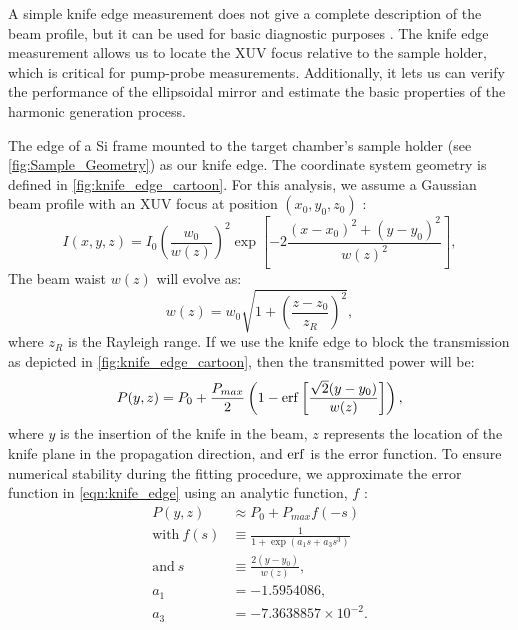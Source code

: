 A simple knife edge measurement does not give a complete description of the beam profile, but it can be used for basic diagnostic purposes \cite{siegmanHowMaybeMeasure1998,siegmanNewDevelopmentsLaser1990,siegmanDefiningMeasuringOptimizing1993}. The knife edge measurement allows us to locate the XUV focus relative to the sample holder, which is critical for pump-probe measurements. Additionally, it lets us can verify the performance of the ellipsoidal mirror and estimate the basic properties of the harmonic generation process.

The edge of a Si frame mounted to the target chamber's sample holder (see \cref{fig:Sample_Geometry}) as our knife edge. The coordinate system geometry is defined in \cref{fig:knife_edge_cartoon}. For this analysis, we assume a Gaussian beam profile with an XUV focus at position $(x_0,y_0,z_0)$ \cite{almeidaHarmonicsBeamsCharacterization2016}:
\begin{equation}
I(x,y,z) = I_0 \left( \frac{w_0}{w(z)} \right)^2 \exp \left[ -2 \frac{ (x-x_0)^2 + (y-y_0)^2 }{w(z)^2} \right],
\end{equation}
The beam waist $w(z)$ will evolve as:
\begin{equation}
w(z) = w_0 \sqrt{ 1 + \left( \frac{z-z_0}{z_R} \right)^2 },
\label{eqn:beam_waist_evolution}
\end{equation}
where $z_R$ is the Rayleigh range. If we use the knife edge to block the transmission as depicted in \cref{fig:knife_edge_cartoon}, then the transmitted power will be:
\begin{equation}
P(y, z) = P_0 + \frac{P_{max}}{2} \left( 1 - \erf \left[ \frac{\sqrt{2}(y-y_0)}{w(z)} \right] \right),
\label{eqn:knife_edge}
\end{equation}
where $y$ is the insertion of the knife in the beam, $z$ represents the location of the knife plane in the propagation direction, and $\erf$ is the error function. To ensure numerical stability during the fitting procedure, we approximate the error function in \cref{eqn:knife_edge} using an analytic function, $f$ \cite{dearaujoMeasurementGaussianLaser2009}:
\begin{equation}
\begin{aligned}
P(y, z) &\approx P_0 + P_{max} f(-s) \\
\textrm{with} \ f(s) &\equiv \frac{1}{1 + \exp(a_1 s + a_3 s^3)} \\
\textrm{and} \ s &\equiv \frac{2(y-y_0)}{w(z)}, \\
a_1 &= -1.5954086, \\
a_3 &= -7.3638857 \times 10^{-2}.
\end{aligned}
\label{eqn:knife_edge_approx}
\end{equation}

